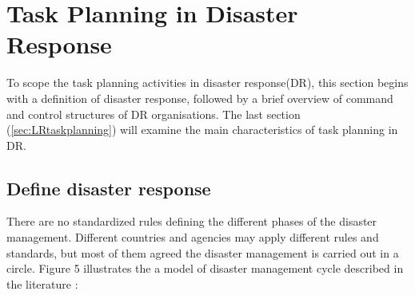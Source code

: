 
\section{Task Planning in Disaster Response}\label{sec:lrplanning}
To scope the task planning activities in disaster response(DR), this section begins with a definition of disaster response, followed by a brief overview of command and control structures of DR organisations. The last section (\ref{sec:LRtaskplanning}) will examine the main characteristics of task planning in DR.\\

\subsection{Define disaster response}
There are no standardized rules defining the different phases of the disaster management. Different countries and agencies may apply different rules and standards, but most of them agreed the disaster management is carried out in a circle. Figure 5 illustrates the a model of disaster management cycle described in the literature \cite{Wattegama2012} :\\

